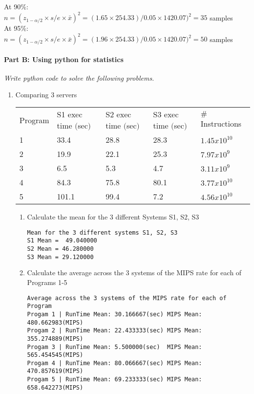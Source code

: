 \documentclass[11pt]{article}
\begin{document}
\begin{enumerate}[(1)]
At 90$\%$:\\
$n = (z_{1-\alpha/2}\times s/e\times\bar{x})^2 = (1.65 \times 254.33)/0.05\times1420.07)^2 = 35$  samples\\

At 95$\%$:\\
$n = (z_{1-\alpha/2}\times s/e\times\bar{x})^2 = (1.96 \times 254.33)/0.05\times1420.07)^2 = 50 $ samples\\
\end{enumerate}

\paragraph{Part B: Using python for statistics} 
\textit{Write python code to solve the following problems.}
\begin{enumerate}[(1)]

\item Comparing 3 servers
\begin{table}[H]
\begin{tabular}{ l  l  l  l  l }
Program  & S1 exec time $($sec$)$ &  S2 exec time $($sec$)$        &      S3 exec time $($sec$)$   &   $\#$ Instructions     \\
1 & 33.4 & 28.8 & 28.3 & $1.45x10^{10}$ \\
2 &19.9&22.1 &25.3 &$7.97x10^{9}$\\
3 &6.5&5.3&4.7&$3.11x10^{9}$\\
4 &84.3&75.8&80.1&$3.77x10^{10}$\\
5 &101.1&99.4&7.2& $4.56x10^{10}$\\
\end{tabular}
\end{table}

\begin{enumerate}[a]
\item Calculate the mean for the 3 different Systems S1, S2, S3\\
\begin{verbatim}
Mean for the 3 different systems S1, S2, S3
S1 Mean =  49.040000
S2 Mean = 46.280000
S3 Mean = 29.120000

\end{verbatim}

\item Calculate the average across the 3 systems of the MIPS rate for each of Programs 1-5 \\
\begin{verbatim}
Average across the 3 systems of the MIPS rate for each of Program
Progam 1 | RunTime Mean: 30.166667(sec)	MIPS Mean: 480.662983(MIPS)
Progam 2 | RunTime Mean: 22.433333(sec)	MIPS Mean: 355.274889(MIPS)
Progam 3 | RunTime Mean: 5.500000(sec)	MIPS Mean: 565.454545(MIPS)
Progam 4 | RunTime Mean: 80.066667(sec)	MIPS Mean: 470.857619(MIPS)
Progam 5 | RunTime Mean: 69.233333(sec)	MIPS Mean: 658.642273(MIPS)


\end{verbatim}
\end{enumerate}
\end{enumerate}
\end{document}
